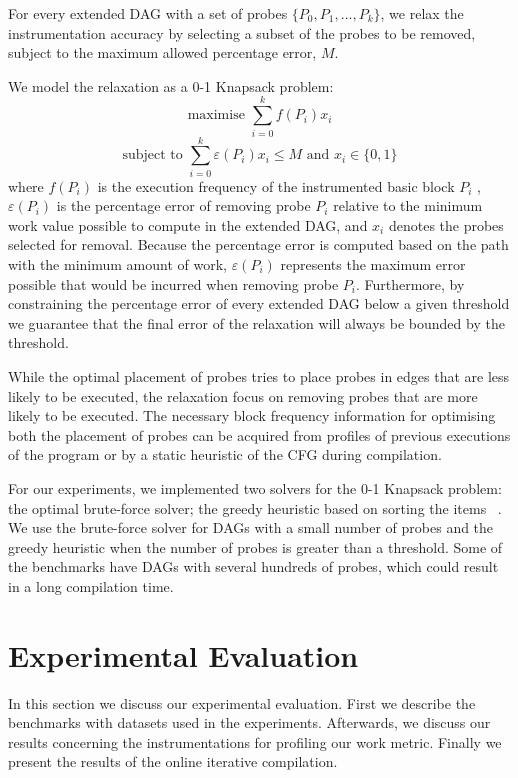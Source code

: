 \documentclass[sigplan,9pt]{acmart}
\newcommand{\itercomp}{{iterative compilation}}
\begin{document}
For every extended DAG with a set of probes $\{P_0, P_1, \ldots, P_k\}$,
we relax the instrumentation accuracy by selecting a subset of the probes to be removed,
subject to the maximum allowed percentage error, $M$.

We model the relaxation as a 0-1 Knapsack problem:
\[
\textrm{maximise } \sum_{i=0}^{k} f(P_i)x_i
\]
\[
\textrm{subject to } \sum_{i=0}^{k} \varepsilon(P_i)x_i \leq M \textrm{ and } x_i\in\{0,1\}
\]
where $f(P_i)$ is the execution frequency of the instrumented basic block $P_i$
,$\varepsilon(P_i)$ is the percentage error of removing probe $P_i$ relative
to the minimum work value possible to compute in the extended DAG,
and $x_i$ denotes the probes selected for removal.
Because the percentage error is computed based on the path with the minimum
amount of work, $\varepsilon(P_i)$ represents the maximum error possible
that would be incurred when removing probe $P_i$.
Furthermore, by constraining the percentage error of every extended DAG below a
given threshold we guarantee that the final error of the relaxation will always
be bounded by the threshold.

While the optimal placement of probes tries to place probes in edges that are
less likely to be executed, the relaxation focus on removing probes that are
more likely to be executed.
The necessary block frequency information for optimising both the placement of
probes can be acquired from profiles of previous executions of the program or
by a static heuristic of the CFG during compilation.

For our experiments, we implemented two solvers for the 0-1 Knapsack problem:
the optimal brute-force solver;
the greedy heuristic based on sorting the items ~\cite{dantzig57}.
We use the brute-force solver for DAGs with a small number of probes and
the greedy heuristic when the number of probes is greater than a threshold.
Some of the benchmarks have DAGs with several hundreds of probes, which could
result in a long compilation time.

\section{Experimental Evaluation}

In this section we discuss our experimental evaluation.
First we describe the benchmarks with datasets used in the experiments.
Afterwards, we discuss our results concerning the instrumentations for profiling
our work metric.
Finally we present the results of the online {\itercomp}.
\end{document}
